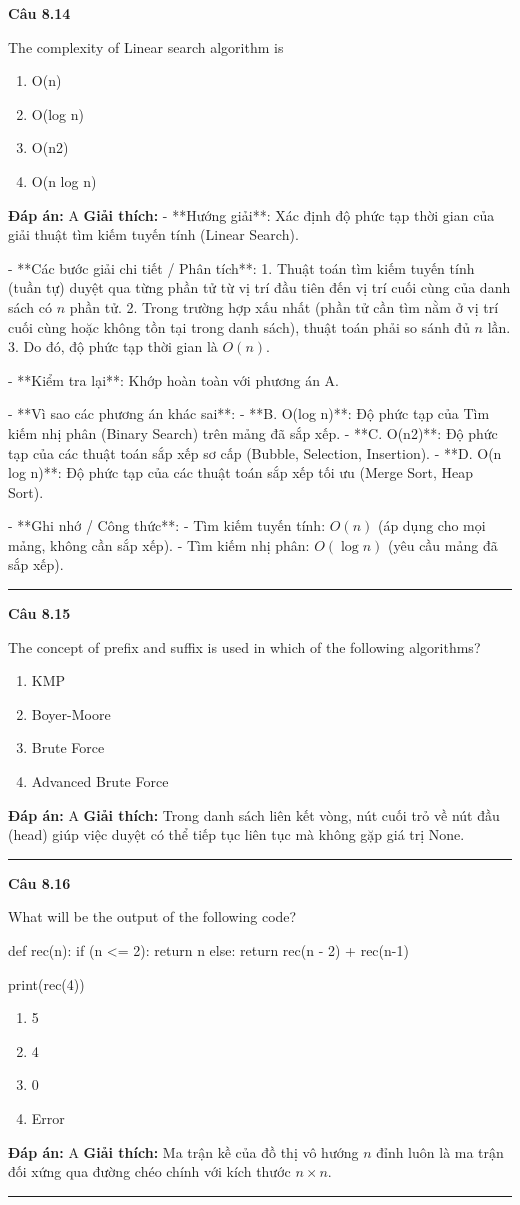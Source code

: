 \documentclass[11pt,a4paper]{article}
\newenvironment{question}[1]{%
  \par\vspace{1em}\noindent\textbf{\large Câu #1}\par\vspace{0.4em}
}{%
  \par\vspace{1em}\hrule\vspace{0.6em}
}
\newenvironment{choices}{%
  \begin{enumerate}[label=\textbf{\Alph*.},leftmargin=2.2em,itemsep=2pt,topsep=3pt]
}{%
  \end{enumerate}
}
\newcommand{\choice}{\item}
\newenvironment{codebox}{%
  \begin{tcolorbox}[colback=gray!8!white,colframe=gray!50!black,arc=1.5mm,boxrule=0.6pt,left=3mm,right=3mm,top=2.5mm,bottom=2.5mm]
  \ttfamily\small
}{%
  \end{tcolorbox}
}
\begin{document}
\begin{question}{8.14}
The complexity of Linear search algorithm is
\begin{choices}
\choice O(n)
\choice O(log n)
\choice O(n2)
\choice O(n log n)
\end{choices}
\textbf{Đáp án:} A
\textbf{Giải thích:} - **Hướng giải**:
  Xác định độ phức tạp thời gian của giải thuật tìm kiếm tuyến tính (Linear Search).

- **Các bước giải chi tiết / Phân tích**:
  1. Thuật toán tìm kiếm tuyến tính (tuần tự) duyệt qua từng phần tử từ vị trí đầu tiên đến vị trí cuối cùng của danh sách có \(n\) phần tử.
  2. Trong trường hợp xấu nhất (phần tử cần tìm nằm ở vị trí cuối cùng hoặc không tồn tại trong danh sách), thuật toán phải so sánh đủ \(n\) lần.
  3. Do đó, độ phức tạp thời gian là \(O(n)\).

- **Kiểm tra lại**:
  Khớp hoàn toàn với phương án A.

- **Vì sao các phương án khác sai**:
  - **B. O(log n)**: Độ phức tạp của Tìm kiếm nhị phân (Binary Search) trên mảng đã sắp xếp.
  - **C. O(n2)**: Độ phức tạp của các thuật toán sắp xếp sơ cấp (Bubble, Selection, Insertion).
  - **D. O(n log n)**: Độ phức tạp của các thuật toán sắp xếp tối ưu (Merge Sort, Heap Sort).

- **Ghi nhớ / Công thức**:
  - Tìm kiếm tuyến tính: \(O(n)\) (áp dụng cho mọi mảng, không cần sắp xếp).
  - Tìm kiếm nhị phân: \(O(\log n)\) (yêu cầu mảng đã sắp xếp).
\end{question}

\begin{question}{8.15}
The concept of prefix and suffix is used in which of the following algorithms?
\begin{choices}
\choice KMP
\choice Boyer-Moore
\choice Brute Force
\choice Advanced Brute Force
\end{choices}
\textbf{Đáp án:} A
\textbf{Giải thích:} Trong danh sách liên kết vòng, nút cuối trỏ về nút đầu (head) giúp việc duyệt có thể tiếp tục liên tục mà không gặp giá trị None.
\end{question}

\begin{question}{8.16}
What will be the output of the following code?
\begin{codebox}
def rec(n):
    if (n <= 2):
        return n
    else:
        return rec(n - 2) + rec(n-1)

print(rec(4))
\end{codebox}
\begin{choices}
\choice 5
\choice 4
\choice 0
\choice Error
\end{choices}
\textbf{Đáp án:} A
\textbf{Giải thích:} Ma trận kề của đồ thị vô hướng \(n\) đỉnh luôn là ma trận đối xứng qua đường chéo chính với kích thước \(n \times n\).
\end{question}
\end{document}
